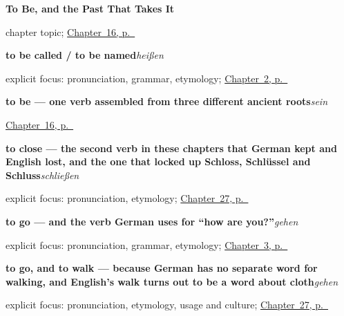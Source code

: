 \noindent\begin{minipage}[t]{\linewidth}
\raggedright
\textbf{To Be, and the Past That Takes It}\par
\footnotesize chapter topic; \hyperref[ch:sein]{Chapter~16, p.~\pageref*{ch:sein}}
\end{minipage}\par\smallskip

\noindent\begin{minipage}[t]{\linewidth}
\raggedright
\textbf{to be called / to be named}\enspace\emph{heißen}\par
\footnotesize explicit focus: pronunciation, grammar, etymology; \hyperref[ch:introductions]{Chapter~2, p.~\pageref*{ch:introductions}}
\end{minipage}\par\smallskip

\noindent\begin{minipage}[t]{\linewidth}
\raggedright
\textbf{to be — one verb assembled from three different ancient roots}\enspace\emph{sein}\par
\footnotesize \hyperref[ch:sein]{Chapter~16, p.~\pageref*{ch:sein}}
\end{minipage}\par\smallskip

\noindent\begin{minipage}[t]{\linewidth}
\raggedright
\textbf{to close — the second verb in these chapters that German kept and English lost, and the one that locked up Schloss, Schlüssel and Schluss}\enspace\emph{schließen}\par
\footnotesize explicit focus: pronunciation, etymology; \hyperref[ch:ge-moving-verbs]{Chapter~27, p.~\pageref*{ch:ge-moving-verbs}}
\end{minipage}\par\smallskip

\noindent\begin{minipage}[t]{\linewidth}
\raggedright
\textbf{to go — and the verb German uses for \textquotedblleft{}how are you?\textquotedblright{}}\enspace\emph{gehen}\par
\footnotesize explicit focus: pronunciation, grammar, etymology; \hyperref[ch:how-are-you]{Chapter~3, p.~\pageref*{ch:how-are-you}}
\end{minipage}\par\smallskip

\noindent\begin{minipage}[t]{\linewidth}
\raggedright
\textbf{to go, and to walk — because German has no separate word for walking, and English's walk turns out to be a word about cloth}\enspace\emph{gehen}\par
\footnotesize explicit focus: pronunciation, etymology, usage and culture; \hyperref[ch:ge-moving-verbs]{Chapter~27, p.~\pageref*{ch:ge-moving-verbs}}
\end{minipage}\par\smallskip

